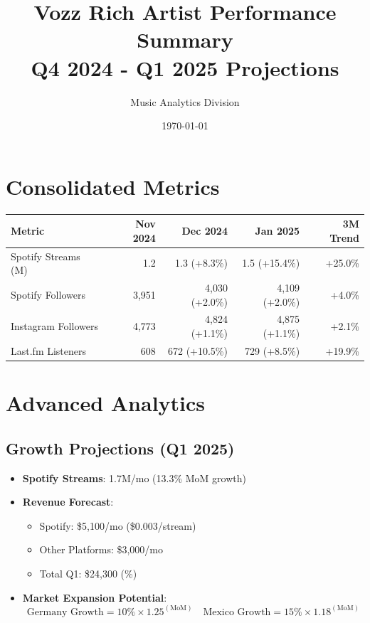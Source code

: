 \documentclass{report}
\begin{document}
\title{Vozz Rich Artist Performance Summary \\ \small Q4 2024 - Q1 2025 Projections}
\author{Music Analytics Division}
\date{\today {}}
\maketitle

\section*{Consolidated Metrics}
\begin{longtable}{|l|r|r|r|r|}
\hline
\textbf{Metric} & \textbf{Nov 2024} & \textbf{Dec 2024} & \textbf{Jan 2025} & \textbf{3M Trend} \\
\hline
Spotify Streams (M) & 1.2 & 1.3 (+8.3\%) & 1.5 (+15.4\%) & +25.0\% \\
Spotify Followers & 3,951 & 4,030 (+2.0\%) & 4,109 (+2.0\%) & +4.0\% \\
Instagram Followers & 4,773 & 4,824 (+1.1\%) & 4,875 (+1.1\%) & +2.1\% \\
Last.fm Listeners & 608 & 672 (+10.5\%) & 729 (+8.5\%) & +19.9\% \\
\hline
\end{longtable}

\section*{Advanced Analytics}
\subsection*{Growth Projections (Q1 2025)}
\begin{itemize}
\item \textbf{Spotify Streams}: 1.7M/mo (13.3\% MoM growth)
\item \textbf{Revenue Forecast}:
  \begin{itemize}
  \item Spotify: \$5,100/mo (\$0.003/stream)
  \item Other Platforms: \$3,000/mo
  \item Total Q1: \$24,300 (\%)
  \end{itemize}
\item \textbf{Market Expansion Potential}:
  \begin{equation}
  \text{Germany Growth} = 10\% \times 1.25^{(\text{MoM})} \quad \text{Mexico Growth} = 15\% \times 1.18^{(\text{MoM})}
  \end{equation}
\end{itemize}
\end{document}
